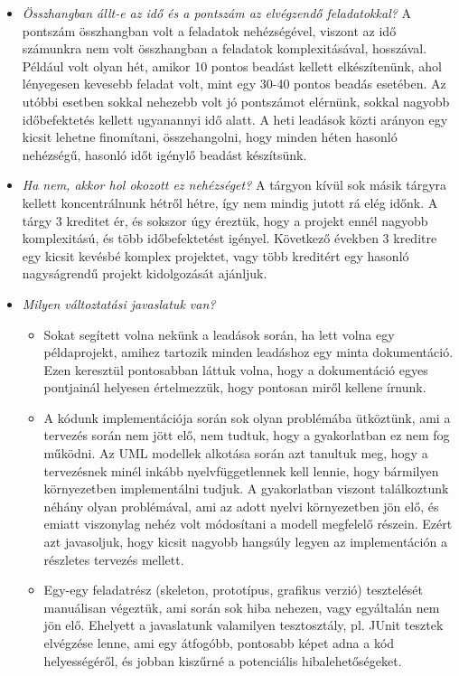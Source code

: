 \documentclass[../../projlab]{subfiles}
\begin{document}
\begin{itemize}
\item \textit{Összhangban állt-e az idő és a pontszám az elvégzendő feladatokkal?} \newline
    A pontszám összhangban volt a feladatok nehézségével, viszont az idő számunkra nem volt összhangban a feladatok komplexitásával, hosszával. Például volt olyan hét, amikor 10 pontos beadást kellett elkészítenünk, ahol lényegesen kevesebb feladat volt, mint egy 30-40 pontos beadás esetében. Az utóbbi esetben sokkal nehezebb volt jó pontszámot elérnünk, sokkal nagyobb időbefektetés kellett ugyanannyi idő alatt. A heti leadások közti arányon egy kicsit lehetne finomítani, összehangolni, hogy minden héten hasonló nehézségű, hasonló időt igénylő beadást készítsünk. 
\item \textit{Ha nem, akkor hol okozott ez nehézséget?} \newline
    A tárgyon kívül sok másik tárgyra kellett koncentrálnunk hétről hétre, így nem mindig jutott rá elég időnk. A tárgy 3 kreditet ér, és sokszor úgy éreztük, hogy a projekt ennél nagyobb komplexitású, és több időbefektetést igényel. Következő években 3 kreditre egy kicsit kevésbé komplex projektet, vagy több kreditért egy hasonló nagyságrendű projekt kidolgozását ajánljuk. 
\item \textit{Milyen változtatási javaslatuk van?} \newline
    \begin{itemize}
        \item Sokat segített volna nekünk a leadások során, ha lett volna egy példaprojekt, amihez tartozik minden leadáshoz egy minta dokumentáció. Ezen keresztül pontosabban láttuk volna, hogy a dokumentáció egyes pontjainál helyesen értelmezzük, hogy pontosan miről kellene írnunk. 
        \item A kódunk implementációja során sok olyan problémába ütköztünk, ami a tervezés során nem jött elő, nem tudtuk, hogy a gyakorlatban ez nem fog működni. Az UML modellek alkotása során azt tanultuk meg, hogy a tervezésnek minél inkább nyelvfüggetlennek kell lennie, hogy bármilyen környezetben implementálni tudjuk. A gyakorlatban viszont találkoztunk néhány olyan problémával, ami az adott nyelvi környezetben jön elő, és emiatt viszonylag nehéz volt módosítani a modell megfelelő részein. Ezért azt javasoljuk, hogy kicsit nagyobb hangsúly legyen az implementáción a részletes tervezés mellett. 
        \item Egy-egy feladatrész (skeleton, prototípus, grafikus verzió) tesztelését manuálisan végeztük, ami során sok hiba nehezen, vagy egyáltalán nem jön elő. Ehelyett a javaslatunk valamilyen tesztosztály, pl. JUnit tesztek elvégzése lenne, ami egy átfogóbb, pontosabb képet adna a kód helyességéről, és jobban kiszűrné a potenciális hibalehetőségeket. 
    \end{itemize}


\end{itemize}
\end{document}
